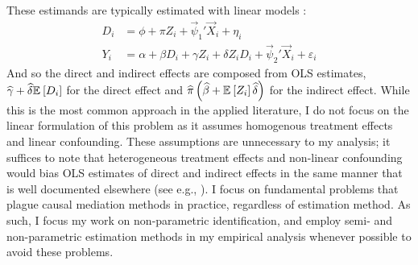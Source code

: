 
These estimands are typically estimated with linear models \citep{imai2010identification}:
\begin{align*}
    D_i &= \phi + \pi Z_i
        + \vec \psi_1' \vec X_i+ \eta_i \\
    Y_i &= \alpha + \beta D_i + \gamma Z_i + \delta Z_i D_i
        + \vec \psi_2' \vec X_i + \varepsilon_i
\end{align*}
And so the direct and indirect effects are composed from OLS estimates,
$\widehat{\gamma} + \widehat{\delta} \mathbb{E}_{} \left[ D_i \right]$ for the direct effect and
$\widehat{\pi} \left(\widehat{\beta} + \mathbb{E}_{} \left[ Z_i \right] \widehat{\delta} \right)$ for the indirect effect.
While this is the most common approach in the applied literature, I do not focus on the linear formulation of this problem as it assumes homogenous treatment effects and linear confounding.
These assumptions are unnecessary to my analysis; it suffices to note that heterogeneous treatment effects and non-linear confounding would bias OLS estimates of direct and indirect effects in the same manner that is well documented elsewhere (see e.g., \citealt{angrist1998estimating,sloczynski2022interpreting}).
I focus on fundamental problems that plague causal mediation methods in practice, regardless of estimation method.
As such, I focus my work on non-parametric identification, and employ semi- and non-parametric estimation methods in my empirical analysis  whenever possible to avoid these problems.

